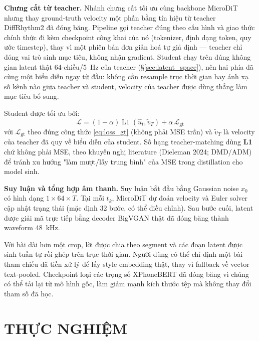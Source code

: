 \documentclass[a4paper,13pt,oneside]{report}
\begin{document}
\textbf{Chưng cất từ teacher.}
\label{sec:distill_teacher_call}
Nhánh chưng cất tối ưu cùng backbone MicroDiT nhưng thay ground-truth velocity một phần
bằng tín hiệu từ teacher DiffRhythm2 đã đóng băng. Pipeline gọi teacher đúng theo cấu hình
và giao thức chính thức đi kèm checkpoint công khai của nó (tokenizer, định dạng token,
quy ước timestep), thay vì một phiên bản đơn giản hoá tự giả định — teacher chỉ đóng vai
trò sinh mục tiêu, không nhận gradient. Student chạy trên đúng không gian latent thật
64-chiều/5~Hz của teacher (\S\ref{sec:latent_space}), nên hai phía đã cùng một biểu diễn
ngay từ đầu: không cần resample trục thời gian hay ánh xạ số kênh nào giữa teacher và
student, velocity của teacher được dùng thẳng làm mục tiêu bổ sung.

\label{sec:distill_mixed_loss}
Student được tối ưu bởi:
\begin{equation}
 \mathcal{L}=(1-\alpha)
 \operatorname{L1}(\hat{u}_t,\tilde{v}_T)
 +\alpha\,\mathcal{L}_{\mathrm{gt}}
\end{equation}
với $\mathcal{L}_{\mathrm{gt}}$ theo đúng công thức \eqref{eq:loss_gt} (không phải MSE
trần) và $\tilde{v}_T$ là velocity của teacher đã quy về biểu diễn của student. Số hạng
teacher-matching dùng \textbf{L1} chứ không phải MSE, theo khuyến nghị literature (Dieleman
2024; DMD/ADM) để tránh xu hướng "làm mượt/lấy trung bình" của MSE trong distillation cho
model sinh.

\textbf{Suy luận và tổng hợp âm thanh.} Suy luận bắt đầu bằng Gaussian noise $x_0$ có hình dạng $1\times64\times T$. Tại mỗi $t_k$, MicroDiT dự đoán velocity và Euler solver cập nhật trạng thái (mặc định 32 bước, có thể điều chỉnh). Sau bước cuối, latent được giải mã trực tiếp bằng decoder BigVGAN thật đã đóng băng thành waveform 48~kHz.

Với bài dài hơn một crop, lời được chia theo segment và các đoạn latent được sinh tuần tự rồi ghép trên trục thời gian. Người dùng có thể chỉ định một bài tham chiếu đã tiền xử lý để lấy style embedding thật, thay vì fallback về vector text-pooled. Checkpoint loại các trọng số XPhoneBERT đã đóng băng vì chúng có thể tải lại từ mô hình gốc, làm giảm mạnh kích thước tệp mà không thay đổi tham số đã học.

\chapter{THỰC NGHIỆM}
\label{chapter:experiment}
\end{document}
